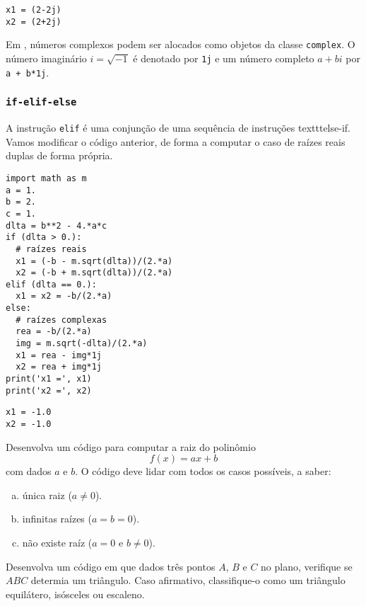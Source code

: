 \documentclass[12pt]{article}
\begin{document}
\begin{verbatim}
x1 = (2-2j)
x2 = (2+2j)
\end{verbatim}

\begin{obs}
  Em {\python}, números complexos podem ser alocados como objetos da classe \texttt{complex}. O número imaginário $i = \sqrt{-1}$ é denotado por \texttt{1j} e um número completo $a + bi$ por \texttt{a + b*1j}.
\end{obs}

\subsubsection{\texttt{if-elif-else}}

A instrução \texttt{elif} é uma conjunção de uma sequência de instruções texttt{else-if}. Vamos modificar o código anterior, de forma a computar o caso de raízes reais duplas de forma própria.

\begin{lstlisting}
import math as m
a = 1.
b = 2.
c = 1.
dlta = b**2 - 4.*a*c
if (dlta > 0.):
  # raízes reais
  x1 = (-b - m.sqrt(dlta))/(2.*a)
  x2 = (-b + m.sqrt(dlta))/(2.*a)
elif (dlta == 0.):
  x1 = x2 = -b/(2.*a)
else:
  # raízes complexas
  rea = -b/(2.*a)
  img = m.sqrt(-dlta)/(2.*a)
  x1 = rea - img*1j
  x2 = rea + img*1j
print('x1 =', x1)
print('x2 =', x2)
\end{lstlisting}

\begin{verbatim}
x1 = -1.0
x2 = -1.0
\end{verbatim}

\begin{exr}
  Desenvolva um código para computar a raiz do polinômio
  \begin{equation}
    f(x) = ax + b
  \end{equation}
  com dados $a$ e $b$. O código deve lidar com todos os casos possíveis, a saber:
  \begin{enumerate}[a)]
    \item única raiz ($a\neq 0$).
    \item infinitas raízes ($a=b=0$).
    \item não existe raíz ($a = 0$ e $b \neq 0$).
  \end{enumerate}
\end{exr}

\begin{exr}
  Desenvolva um código em que dados três pontos $A$, $B$ e $C$ no plano, verifique se $ABC$ determia um triângulo. Caso afirmativo, classifique-o como um triângulo equilátero, isósceles ou escaleno.
\end{exr}
\end{document}
